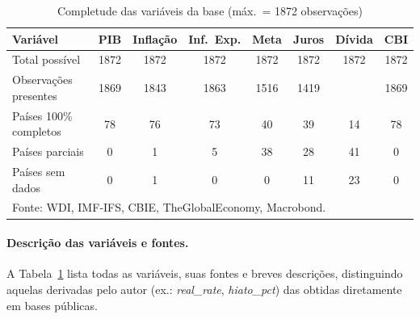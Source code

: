 \documentclass[a4paper,12pt]{article}[abnt2]
\begin{document}
\begin{table}[H]
\centering
\small
\caption{Completude das variáveis da base (máx.\ = 1872 observações)}
\label{tab:base_dados}
\setlength{\tabcolsep}{4pt}
\begin{tabular}{lccccccc}
\toprule
\textbf{Variável} & \textbf{PIB} & \textbf{Inflação} & \textbf{Inf.\ Exp.} & \textbf{Meta} & \textbf{Juros} & \textbf{Dívida} & \textbf{CBI} \\
\midrule
Total possível           & 1872 & 1872 & 1872 & 1872 & 1872 & 1872 & 1872 \\
Observações presentes    & 1869 & 1843 & 1863 & 1516 & 1419 & \;923 & 1869 \\
Países 100\% completos  & 78    & 76    & 73    & 40    & 39    & 14   & 78   \\
Países parciais          & 0     & 1     & 5     & 38    & 28    & 41   & 0    \\
Países sem dados         & 0     & 1     & 0     & 0     & 11    & 23   & 0    \\
\bottomrule
\multicolumn{8}{l}{\footnotesize Fonte: WDI, IMF‑IFS, CBIE, TheGlobalEconomy, Macrobond.}
\end{tabular}
\end{table}

\paragraph{Descrição das variáveis e fontes.}  
A Tabela~\ref{tab:base_dados} lista todas as variáveis, suas fontes e breves descrições, distinguindo aquelas derivadas pelo autor (ex.: \textit{real\_rate}, \textit{hiato\_pct}) das obtidas diretamente em bases públicas.
\end{document}
